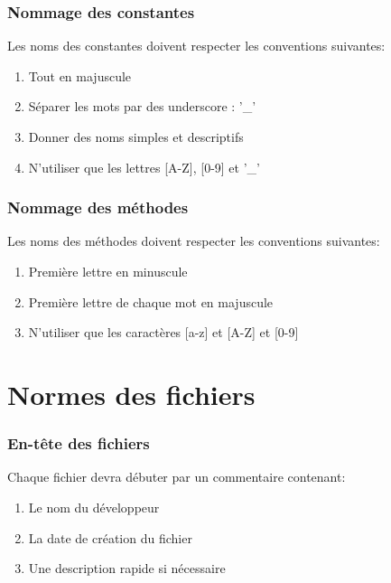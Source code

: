 \documentclass{article}
\begin{document}
\section{Nommage des constantes}

Les noms des constantes doivent respecter les conventions suivantes:

\begin{enumerate}

\item Tout en majuscule
\item Séparer les mots par des underscore : '\_'
\item Donner des noms simples et descriptifs
\item N'utiliser que les lettres [A-Z], [0-9] et '\_'

\end{enumerate}

\section{Nommage des méthodes}

Les noms des méthodes doivent respecter les conventions suivantes: 

\begin{enumerate}
\item Première lettre en minuscule
\item Première lettre de chaque mot en majuscule
\item N'utiliser que les caractères [a-z] et [A-Z] et [0-9]
\end{enumerate}


\newpage
{}
\part*{Normes des fichiers}
\setcounter{section}{0}
\section{En-tête des fichiers}

Chaque fichier devra débuter par un commentaire contenant:

\begin{enumerate}
\item Le nom du développeur
\item La date de création du fichier
\item Une description rapide si nécessaire
\end{enumerate}
\end{document}
